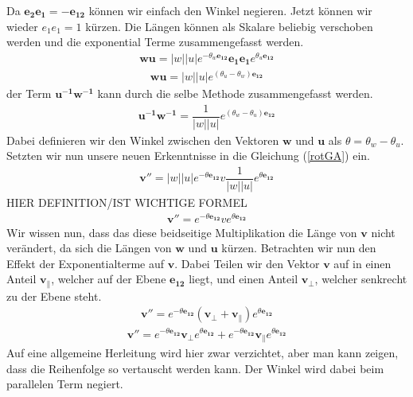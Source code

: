Da $\mathbf{e_2e_1 = -e_{12}}$ können wir einfach den Winkel negieren.
Jetzt können wir wieder $e_1e_1 = 1$ kürzen. Die Längen können als Skalare beliebig verschoben werden und die exponential Terme zusammengefasst werden.
\begin{align}
	\mathbf{wu} = |w||u|e^{-\theta_w \mathbf{e_{12}}}\mathbf{e_1}\mathbf{e_1} e^{\theta_u \mathbf{e_{12}}}
\end{align}
\begin{align}
	\mathbf{wu} = |w||u|e^{(\theta_u-\theta_w) \mathbf{e_{12}}}
\end{align}
der Term $\mathbf{u^{-1}w^{-1}}$ kann durch die selbe Methode zusammengefasst werden. 
\begin{align}
	\mathbf{u^{-1}w^{-1}} = \dfrac{1}{|w||u|}e^{(\theta_w-\theta_u) \mathbf{e_{12}}}
\end{align}
Dabei definieren wir den Winkel zwischen den Vektoren  $\mathbf{w}$ und $\mathbf{u}$ als $\theta = \theta_w - \theta_u$. Setzten wir nun unsere neuen Erkenntnisse in die Gleichung (\ref{rotGA}) ein.
\begin{align}
	\mathbf{v''} = |w||u|e^{-\theta \mathbf{e_{12}}} v \dfrac{1}{|w||u|}e^{\theta \mathbf{e_{12}}}
\end{align}
HIER DEFINITION/IST WICHTIGE FORMEL
\begin{align}
	\mathbf{v''} = e^{-\theta \mathbf{e_{12}}} v e^{\theta \mathbf{e_{12}}}
\end{align}
Wir wissen nun, dass das diese beidseitige Multiplikation die Länge von $\mathbf{v}$ nicht verändert, da sich die Längen von $\mathbf{w}$ und $\mathbf{u}$ kürzen. Betrachten wir nun den Effekt der Exponentialterme auf $\mathbf{v}$. Dabei Teilen wir den Vektor $\mathbf{v}$ auf in einen Anteil $\mathbf{v_\parallel}$, welcher auf der Ebene $\mathbf{e_{12}}$ liegt, und einen Anteil $\mathbf{v_\perp}$, welcher senkrecht zu der Ebene steht.
\begin{align} \label{RotAufPerpPar}
	\mathbf{v''} = e^{-\theta \mathbf{e_{12}}} (\mathbf{v_\perp + v_\parallel}) e^{\theta \mathbf{e_{12}}}
\end{align}
\begin{align}
	\mathbf{v''} = e^{-\theta \mathbf{e_{12}}} \mathbf{v_\perp} e^{\theta \mathbf{e_{12}}} + e^{-\theta \mathbf{e_{12}}} \mathbf{v_\parallel} e^{\theta \mathbf{e_{12}}}
\end{align}
Auf eine allgemeine Herleitung wird hier zwar verzichtet, aber man kann zeigen, dass die Reihenfolge so vertauscht werden kann. Der Winkel wird dabei beim parallelen Term negiert.
